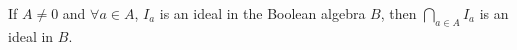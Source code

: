 If $A \neq 0$ and $\forall a \in A$, $I_a$ is an ideal in the Boolean algebra $B$, then $\bigcap_{a \in A} I_a$ is an ideal in $B$.
